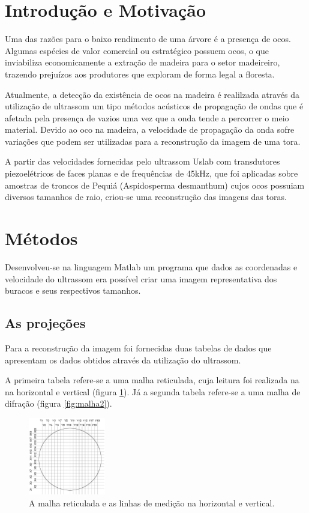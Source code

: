 \documentclass[10pt,a4paper]{article}
\begin{document}
\tableofcontents
\newpage 

\section{Introdução e Motivação}
Uma das razões para o baixo rendimento de uma árvore é a presença de ocos.
Algumas espécies de valor comercial ou estratégico possuem ocos, o que
inviabiliza economicamente a extração de madeira para o setor madeireiro,
trazendo prejuízos aos produtores que exploram de forma legal a floresta\cite{Proj}.

Atualmente, a detecção da existência de ocos na madeira é realilzada através da utilização de ultrassom um tipo métodos acústicos de propagação de ondas que é afetada pela presença de vazios uma vez que a onda tende a percorrer o meio material.  
Devido ao oco na madeira, a velocidade de propagação da onda
sofre variações que podem ser utilizadas para a reconstrução da imagem de uma tora.

A partir das velocidades fornecidas pelo ultrassom Uslab com transdutores piezoelétricos de faces planas e de frequências de 45kHz, que foi aplicadas sobre amostras de troncos de Pequiá (Aspidosperma desmanthum) cujos ocos possuiam diversos tamanhos de raio, criou-se uma reconstrução das imagens das toras.

\section{Métodos}

Desenvolveu-se na linguagem Matlab\cite{MAT} um programa que dados as
coordenadas e velocidade do ultrassom era possível criar uma imagem
representativa dos buracos e seus respectivos tamanhos.

\subsection{As projeções}

Para a reconstrução da imagem foi fornecidas duas tabelas de dados que
apresentam os dados obtidos através da utilização do ultrassom.

A primeira tabela refere-se a uma malha reticulada,  cuja leitura foi
realizada na na horizontal e vertical (figura \ref{fig:malha1}).
Já a segunda tabela refere-se a uma malha de difração (figura \ref{fig:malha2}).

\begin{figure}[h!]
  \begin{center}
    \leavevmode
    \includegraphics[width=0.3\textwidth]{malha1}
  \end{center}
  \label{fig:malha1}
  \caption{A malha reticulada e as linhas de medição na horizontal e vertical.}
\end{figure}
\end{document}
